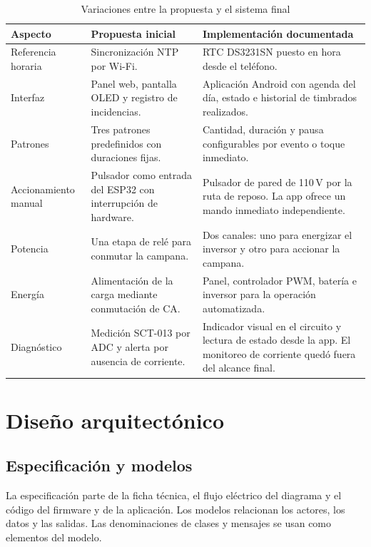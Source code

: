 \documentclass[a4paper,11pt]{article}
\begin{document}
\begin{table}[H]
\centering\small
\caption{Variaciones entre la propuesta y el sistema final}
\label{tab:variaciones}
\begin{tabularx}{\linewidth}{@{}P{2.35cm}YY@{}}
\toprule
\textbf{Aspecto} & \textbf{Propuesta inicial} & \textbf{Implementación documentada} \\
\midrule
Referencia horaria & Sincronización NTP por Wi-Fi. & RTC DS3231SN puesto en hora desde el teléfono. \\
Interfaz & Panel web, pantalla OLED y registro de incidencias. & Aplicación Android con agenda del día, estado e historial de timbrados realizados. \\
Patrones & Tres patrones predefinidos con duraciones fijas. & Cantidad, duración y pausa configurables por evento o toque inmediato. \\
Accionamiento manual & Pulsador como entrada del ESP32 con interrupción de hardware. & Pulsador de pared de 110\,V por la ruta de reposo. La app ofrece un mando inmediato independiente. \\
Potencia & Una etapa de relé para conmutar la campana. & Dos canales: uno para energizar el inversor y otro para accionar la campana. \\
Energía & Alimentación de la carga mediante conmutación de CA. & Panel, controlador PWM, batería e inversor para la operación automatizada. \\
Diagnóstico & Medición SCT-013 por ADC y alerta por ausencia de corriente. & Indicador visual en el circuito y lectura de estado desde la app. El monitoreo de corriente quedó fuera del alcance final. \\
\bottomrule
\end{tabularx}
\end{table}

\clearpage
\section{Diseño arquitectónico}
\subsection{Especificación y modelos}
La especificación parte de la ficha técnica, el flujo eléctrico del diagrama y el código del firmware y de la aplicación. Los modelos relacionan los actores, los datos y las salidas. Las denominaciones de clases y mensajes se usan como elementos del modelo.
\end{document}
